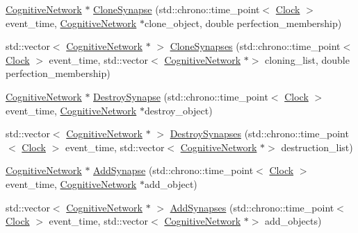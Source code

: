 \begin{DoxyCompactItemize}
\item 
\mbox{\hyperlink{class_cognitive_network}{Cognitive\+Network}} $\ast$ \mbox{\hyperlink{class_cognitive_network_a40f88d3ce9d386ee4db5c1e0ad84dad2}{Clone\+Synapse}} (std\+::chrono\+::time\+\_\+point$<$ \mbox{\hyperlink{universe_8h_a0ef8d951d1ca5ab3cfaf7ab4c7a6fd80}{Clock}} $>$ event\+\_\+time, \mbox{\hyperlink{class_cognitive_network}{Cognitive\+Network}} $\ast$clone\+\_\+object, double perfection\+\_\+membership)
\item 
std\+::vector$<$ \mbox{\hyperlink{class_cognitive_network}{Cognitive\+Network}} $\ast$ $>$ \mbox{\hyperlink{class_cognitive_network_a82fe792704bcbf7df56b3023266f5f70}{Clone\+Synapses}} (std\+::chrono\+::time\+\_\+point$<$ \mbox{\hyperlink{universe_8h_a0ef8d951d1ca5ab3cfaf7ab4c7a6fd80}{Clock}} $>$ event\+\_\+time, std\+::vector$<$ \mbox{\hyperlink{class_cognitive_network}{Cognitive\+Network}} $\ast$$>$ cloning\+\_\+list, double perfection\+\_\+membership)
\item 
\mbox{\hyperlink{class_cognitive_network}{Cognitive\+Network}} $\ast$ \mbox{\hyperlink{class_cognitive_network_a08b87aa9a0823355ef7cef77414dc6dc}{Destroy\+Synapse}} (std\+::chrono\+::time\+\_\+point$<$ \mbox{\hyperlink{universe_8h_a0ef8d951d1ca5ab3cfaf7ab4c7a6fd80}{Clock}} $>$ event\+\_\+time, \mbox{\hyperlink{class_cognitive_network}{Cognitive\+Network}} $\ast$destroy\+\_\+object)
\item 
std\+::vector$<$ \mbox{\hyperlink{class_cognitive_network}{Cognitive\+Network}} $\ast$ $>$ \mbox{\hyperlink{class_cognitive_network_a141e9e8e6337d42fc19edd75bb50e47b}{Destroy\+Synapses}} (std\+::chrono\+::time\+\_\+point$<$ \mbox{\hyperlink{universe_8h_a0ef8d951d1ca5ab3cfaf7ab4c7a6fd80}{Clock}} $>$ event\+\_\+time, std\+::vector$<$ \mbox{\hyperlink{class_cognitive_network}{Cognitive\+Network}} $\ast$$>$ destruction\+\_\+list)
\item 
\mbox{\hyperlink{class_cognitive_network}{Cognitive\+Network}} $\ast$ \mbox{\hyperlink{class_cognitive_network_a4bfdcd2affdfe2adb2da68dba60dff0e}{Add\+Synapse}} (std\+::chrono\+::time\+\_\+point$<$ \mbox{\hyperlink{universe_8h_a0ef8d951d1ca5ab3cfaf7ab4c7a6fd80}{Clock}} $>$ event\+\_\+time, \mbox{\hyperlink{class_cognitive_network}{Cognitive\+Network}} $\ast$add\+\_\+object)
\item 
std\+::vector$<$ \mbox{\hyperlink{class_cognitive_network}{Cognitive\+Network}} $\ast$ $>$ \mbox{\hyperlink{class_cognitive_network_a09d9e01cbd8596af7fac626ce2753643}{Add\+Synapses}} (std\+::chrono\+::time\+\_\+point$<$ \mbox{\hyperlink{universe_8h_a0ef8d951d1ca5ab3cfaf7ab4c7a6fd80}{Clock}} $>$ event\+\_\+time, std\+::vector$<$ \mbox{\hyperlink{class_cognitive_network}{Cognitive\+Network}} $\ast$$>$ add\+\_\+objects)
$$
\end{DoxyCompactItemize}
